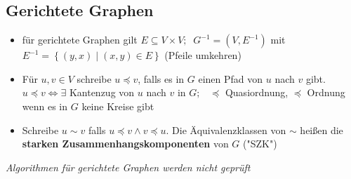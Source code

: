 \documentclass[10pt,a4paper]{article}
\begin{document}
\subsection{Gerichtete Graphen}
\begin{itemize}
\item für gerichtete Graphen gilt $E\subseteq V\times V;\;\;G^{-1}=(V,E^{-1})$ mit $E^{-1}=\left\lbrace (y,x)\mid (x,y)\in E\right\rbrace$ (Pfeile umkehren) 
\item Für $u,v\in V$ schreibe $u\preceq v$, falls es in $G$ einen Pfad von $u$ nach $v$ gibt. $u\preceq v \Leftrightarrow \exists$ Kantenzug von $u$ nach $v$ in $G;\;\;\;
\preceq $ Quasiordnung, $\preceq$ Ordnung wenn es in $G$ keine Kreise gibt 
\item Schreibe $u \sim v$ falls $u\preceq v \land v\preceq u$. Die Äquivalenzklassen von $\sim$ heißen die \textbf{starken Zusammenhangskomponenten} von $G$ ("SZK")


\end{itemize}
\textit{Algorithmen für gerichtete Graphen werden nicht geprüft}
\end{document}
